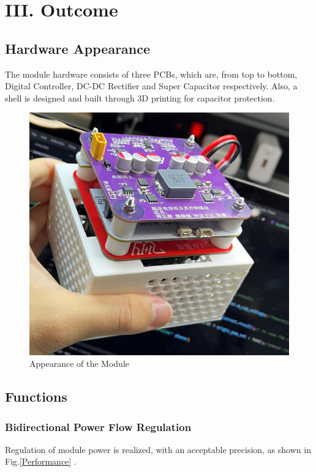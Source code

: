 \documentclass[a4paper,num-refs]{oup-contemporary}
\begin{document}
\section{III. Outcome}
\subsection{Hardware Appearance}
The module hardware consists of three PCBs, which are, from top to bottom, Digital Controller, DC-DC Rectifier and Super Capacitor respectively. Also, a shell is designed and built through 3D printing for capacitor protection.
\begin{figure}[h]
	\centering
	\includegraphics[width=0.7\linewidth]{Look.jpg}
	\caption{Appearance of the Module}
\end{figure} 

\subsection{Functions}
\subsubsection{Bidirectional Power Flow Regulation}
Regulation of module power is realized, with an acceptable precision, as shown in Fig.\ref{Performance} .
\end{document}
